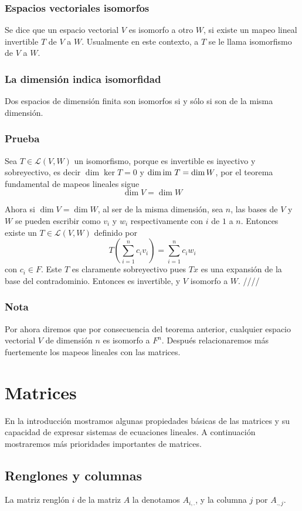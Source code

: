 \documentclass{article}
\begin{document}
\subsubsection{Espacios vectoriales isomorfos}
Se dice que un espacio vectorial $V$ es isomorfo a otro $W$,
si existe un mapeo lineal invertible $T$ de $V$ a $W$. Usualmente en 
este contexto, a $T$ se le llama isomorfismo de $V$ a $W$.

\subsubsection{La dimensión indica isomorfidad}
Dos espacios de dimensión finita son isomorfos
si y sólo si son de la misma dimensión.
\subsubsection*{Prueba}
Sea $T\in\mathcal{L}(V,W)$ un isomorfismo, porque es invertible es 
inyectivo y sobreyectivo, es decir $\dim\ker T = 0$ y
$\dim\text{im } T = \dim W$, por el teorema fundamental de mapeos lineales
sigue $$\dim V = \dim W$$

Ahora si $\dim V = \dim W$, al ser de la misma dimensión, sea $n$, las 
bases de $V$ y $W$ se pueden escribir como $v_i$ y $w_i$ 
respectivamente con $i$ de $1$ a $n$. Entonces existe un 
$T\in\mathcal{L}(V,W)$ definido por
$$T\left(\sum^n_{i=1}c_i v_i\right) = \sum^n_{i=1}c_i w_i$$
con $c_i\in F$. Este $T$ es claramente sobreyectivo pues $Tx$ es una
expansión de la base del contradominio. Entonces es invertible, y
$V$ isomorfo a $W$. \hfill ////

\subsubsection{Nota}
Por ahora diremos que por consecuencia del teorema anterior, cualquier espacio vectorial $V$ de dimensión $n$ es isomorfo a $F^n$.
Después relacionaremos más fuertemente los mapeos lineales con
las matrices.

\newpage

\section{Matrices}
En la introducción mostramos algunas propiedades básicas de las
matrices y su capacidad de expresar sistemas de ecuaciones lineales.
A continuación mostraremos más prioridades importantes de matrices.

\subsection{Renglones y columnas}
La matriz renglón $i$ de la matriz $A$ la denotamos
$A_{i,.}$, y la columna $j$ por $A_{.,j}$.
\end{document}
